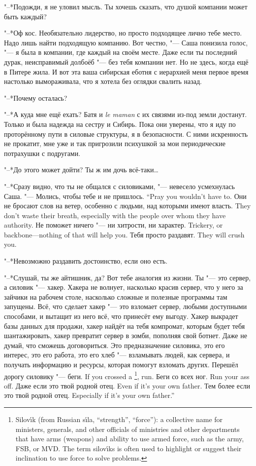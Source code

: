 "--*Подожди, я не уловил мысль.
Ты хочешь сказать, что душой компании может быть каждый?

"--*Оф кос.
Необязательно лидерство, но просто подходящее лично тебе место.
Надо лишь найти подходящую компанию.
Вот честно, "--- Саша понизила голос, "--- я была в компании, где каждый на своём месте.
Даже если ты последний дурак, неисправимый долбоёб "--- без тебя компании нет.
Но не здесь, когда ещё в Питере жила.
И вот эта ваша сибирская еботня с иерархией меня первое время настолько вымораживала, что я хотела без оглядки свалить назад.

"--*Почему осталась?

"--*А куда мне ещё ехать?
Батя и \textit{le maman} с их связями из-под земли достанут.
Только и была надежда на сестру и Сибирь.
Пока они уверены, что я иду по проторённому пути в силовые структуры, я в безопасности.
С ними искренность не прокатит, мне уже и так пригрозили психушкой за мои периодические потрахушки с подругами.

"--*До этого может дойти?
Ты ж им дочь всё-таки\ldots{}

"--*Сразу видно, что ты не общался с силовиками, "--- невесело усмехнулась Саша.
{"--- Молись, чтобы тебе и не пришлось.}
{``Pray you wouldn't have to.}
{Они не бросают слов на ветер, особенно с людьми, над которыми имеют власть.}
{They don't waste their breath, especially with the people over whom they have authority.}
{Не поможет ничего "--- ни хитрости, ни характер.}
{Trickery, or backbone---nothing of that will help you.}
{Тебя просто раздавят.}
{They will crush you.}

"--*Невозможно раздавить достоинство, если оно есть.

"--*Слушай, ты же айтишник, да?
Вот тебе аналогия из жизни.
Ты "--- это сервер, а силовик "--- хакер.
Хакера не волнует, насколько красив сервер, что у него за зайчики на рабочем столе, насколько сложные и полезные программы там запущены.
Всё, что сделает хакер "--- это взломает сервер, любыми доступными способами, и вытащит из него всё, что принесёт ему выгоду.
Хакер выкрадет базы данных для продажи, хакер найдёт на тебя компромат, которым будет тебя шантажировать, хакер превратит сервер в зомби, пополняя свой ботнет.
Даже не думай, что сможешь договориться.
Это предназначение силовика, это его интерес, это его работа, это его хлеб "--- взламывать людей, как сервера, и получать информацию и ресурсы, которая помогут взломать других.
{Перешёл дорогу силовику "--- беги.}
{If you crossed a \silovik\footnote{Silov\'{\i}k (from Russian s\'{\i}la, ``strength'', ``force''): a collective name for ministers, generals, and other officials of ministries and other departments that have arms (weapons) and ability to use armed force, such as the army, FSB, or MVD. The term silov\'{\i}ks is often used to highlight or suggest their inclination to use force to solve problems.}, run.}
{Беги со всех ног.}
{Run your ass off.}
{Даже если это твой родной отец.}
{Even if it's your own father.}
{Тем более если это твой родной отец.}
{Especially if it's your own father.''}

